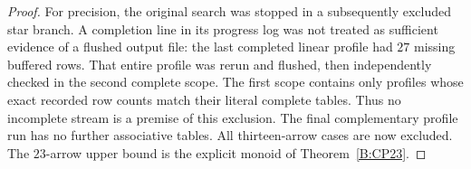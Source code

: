 \begin{proof}
For precision, the original search was stopped in a subsequently
excluded star branch.  A completion line in its progress log was
not treated as sufficient evidence of a flushed output file:
the last completed linear profile had $27$ missing buffered rows.
That entire profile was rerun and flushed, then independently
checked in the second complete scope.  The first scope contains
only profiles whose exact recorded row counts match their literal
complete tables.  Thus no incomplete stream is a premise of this
exclusion.  The final complementary profile run has no further
associative tables.  All thirteen-arrow cases are now excluded.
The $23$-arrow upper bound is the explicit monoid of
Theorem~\ref{B:CP23}.
\end{proof}

